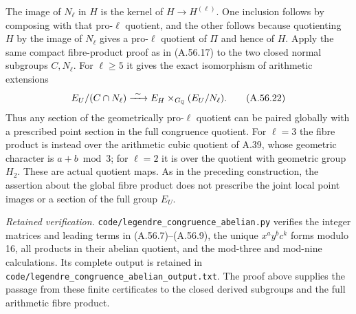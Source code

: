 The image of $N_\ell$ in $H$ is the kernel of
$H\to H^{(\ell)}$.  One inclusion follows by composing
with that pro-$\ell$ quotient, and the other follows
because quotienting $H$ by the image of $N_\ell$ gives
a pro-$\ell$ quotient of $\Pi$ and hence of $H$.
Apply the same compact fibre-product proof as in
(A.56.17) to the two closed normal subgroups
$C,N_\ell$.  For $\ell\ge5$ it gives the exact
isomorphism of arithmetic extensions
\[
 E_U/(C\cap N_\ell)
       \xrightarrow{\ \sim\ }
                  E_H\times_{G_\mathbb Q}(E_U/N_\ell).
\tag{A.56.22}
\]
Thus any section of the geometrically pro-$\ell$
quotient can be paired globally with a prescribed
point section in the full congruence quotient.
For $\ell=3$ the fibre product is instead over the
arithmetic cubic quotient of A.39, whose geometric
character is $a+b\bmod3$; for $\ell=2$ it is over
the quotient with geometric group $H_2$.
These are actual quotient maps.  As in the preceding
construction, the assertion about the global fibre
product does not prescribe the joint local point
images or a section of the full group $E_U$.

\noindent\emph{Retained verification.}
\texttt{code/legendre\_congruence\_abelian.py} verifies the
integer matrices and leading terms in (A.56.7)--(A.56.9), the
unique $x^a y^b c^k$ forms modulo 16, all products in their
abelian quotient, and the mod-three and mod-nine calculations.
Its complete output is retained in
\texttt{code/legendre\_congruence\_abelian\_output.txt}.
The proof above supplies the passage from these finite
certificates to the closed derived subgroups and the full
arithmetic fibre product.
